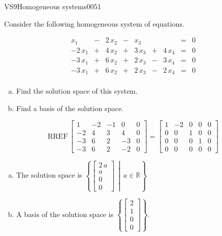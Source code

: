 \begin{exercise}{VS9}{Homogeneous systems}{0051} 
\begin{exerciseStatement} 

Consider the following homogeneous system of equations.

 \[\begin{matrix}
 x_{1} &  -  & 2 \, x_{2} &  -  & x_{3} &  &  & = & 0 \\
 -2 \, x_{1} &  +  & 4 \, x_{2} &  +  & 3 \, x_{3} &  +  & 4 \, x_{4} & = & 0 \\
 -3 \, x_{1} &  +  & 6 \, x_{2} &  +  & 2 \, x_{3} &  -  & 3 \, x_{4} & = & 0 \\
 -3 \, x_{1} &  +  & 6 \, x_{2} &  +  & 2 \, x_{3} &  -  & 2 \, x_{4} & = & 0 \\
 \end{matrix}\] 

\begin{enumerate}[(a)]
\item  Find the solution space of this system.
\item  Find a basis of the solution space.
\end{enumerate}

     \end{exerciseStatement}
 \begin{exerciseAnswer} 

\[\mathrm{RREF}\,\left[\begin{array}{cccc|c}
1 & -2 & -1 & 0 & 0 \\
-2 & 4 & 3 & 4 & 0 \\
-3 & 6 & 2 & -3 & 0 \\
-3 & 6 & 2 & -2 & 0
\end{array}\right]=\left[\begin{array}{cccc|c}
1 & -2 & 0 & 0 & 0 \\
0 & 0 & 1 & 0 & 0 \\
0 & 0 & 0 & 1 & 0 \\
0 & 0 & 0 & 0 & 0
\end{array}\right]\]

 

\begin{enumerate}[(a)]
\item The solution space is \( \left\{ \left[\begin{array}{c}
2 \, a \\
a \\
0 \\
0
\end{array}\right] \,\middle|\, a \in\mathbb R \right\} \) 
\item A basis of the solution space is \(\left\{ \left[\begin{array}{c}
2 \\
1 \\
0 \\
0
\end{array}\right] \right\}\).
\end{enumerate}

     \end{exerciseAnswer}
 \end{exercise}


